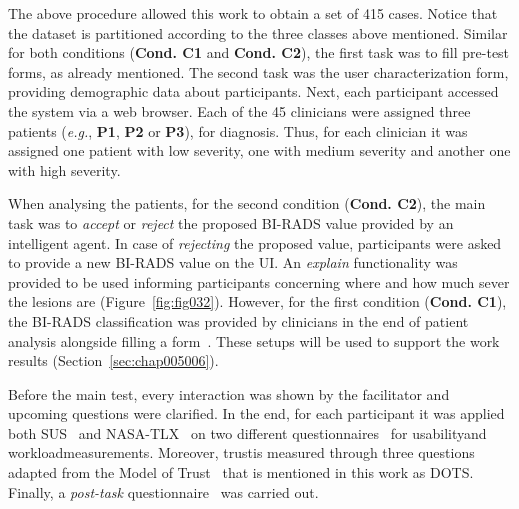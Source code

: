 \vspace{1.5mm}

The above procedure allowed this work to obtain a set of 415 cases.
Notice that the dataset is partitioned according to the three classes above mentioned.
Similar for both conditions ({\bf Cond. C1} and {\bf Cond. C2}), the first task was to fill pre-test forms, as already mentioned.
The second task was the user characterization form, providing demographic data about participants.
Next, each participant accessed the system via a web browser.
Each of the 45 clinicians were assigned three patients ({\it e.g.}, {\bf P1}, {\bf P2} or {\bf P3}), for diagnosis.
Thus, for each clinician it was assigned one patient with low severity, one with medium severity and another one with high severity.

When analysing the patients, for the second condition ({\bf Cond. C2}), the main task was to {\it accept} or {\it reject} the proposed \ac{BI-RADS} value provided by an intelligent agent.
In case of {\it rejecting} the proposed value, participants were asked to provide a new \ac{BI-RADS} value on the \ac{UI}.
An {\it explain} functionality was provided to be used informing participants concerning where and how much sever the lesions are (Figure~\ref{fig:fig032}).
However, for the first condition ({\bf Cond. C1}), the \ac{BI-RADS} classification was provided by clinicians in the end of patient analysis alongside filling a form~\cite{https://doi.org/10.13140/rg.2.2.36306.86725}.
These setups will be used to support the work results (Section~\ref{sec:chap005006}).

Before the main test, every interaction was shown by the facilitator and upcoming questions were clarified.
In the end, for each participant it was applied both \ac{SUS}~\cite{Tyllinen:2016:WNN:2858036.2858570} and \ac{NASA-TLX}~\cite{ramkumar2017using, grier2015high} on two different questionnaires~\cite{https://doi.org/10.13140/rg.2.2.25301.06883, https://doi.org/10.13140/rg.2.2.26978.79044} for usability\footnotemark[21] and workload\footnotemark[22] measurements.
Moreover, trust\footnotemark[100] is measured through three questions adapted from the Model of Trust~\cite{schoorman2016perspective} that is mentioned in this work as \ac{DOTS}.
Finally, a {\it post-task} questionnaire~\cite{https://doi.org/10.13140/rg.2.2.16566.14403/1} was carried out.


